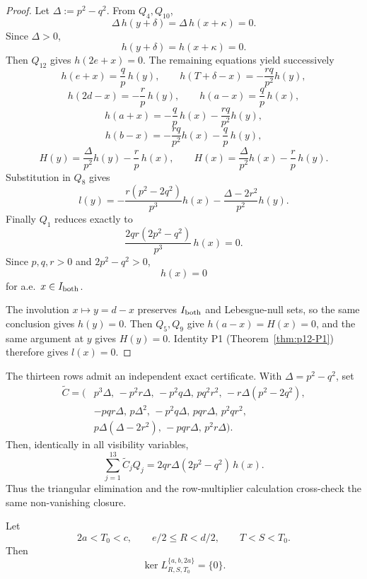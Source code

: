 \begin{proof}
Let \(\Delta:=p^2-q^2\).  From \(Q_4,Q_{10}\),
\[
\Delta\,h(y+\delta)=\Delta\,h(x+\kappa)=0.
\]
Since \(\Delta>0\),
\[
h(y+\delta)=h(x+\kappa)=0.
\]
Then \(Q_{12}\) gives \(h(2e+x)=0\).  The remaining equations yield
successively
\[
h(e+x)=\frac qp\,h(y),
\qquad
h(T+\delta-x)=-\frac{rq}{p^2}h(y),
\]
\[
h(2d-x)=-\frac rp\,h(y),
\qquad
h(a-x)=\frac qp\,h(x),
\]
\[
h(a+x)=-\frac qp\,h(x)-\frac{rq}{p^2}h(y),
\]
\[
h(b-x)=-\frac{rq}{p^2}h(x)-\frac qp\,h(y),
\]
\[
H(y)=\frac{\Delta}{p^2}h(y)-\frac rp\,h(x),
\qquad
H(x)=\frac{\Delta}{p^2}h(x)-\frac rp\,h(y).
\]
Substitution in \(Q_8\) gives
\[
l(y)=
-\frac{r(p^2-2q^2)}{p^3}h(x)
-\frac{\Delta-2r^2}{p^2}h(y).
\]
Finally \(Q_1\) reduces exactly to
\[
\frac{2qr(2p^2-q^2)}{p^3}\,h(x)=0.
\]
Since \(p,q,r>0\) and \(2p^2-q^2>0\),
\[
h(x)=0
\]
for a.e.\ \(x\in I_{\rm both}\).

The involution \(x\mapsto y=d-x\) preserves \(I_{\rm both}\) and
Lebesgue-null sets, so the same conclusion gives \(h(y)=0\).
Then \(Q_5,Q_9\) give \(h(a-x)=H(x)=0\), and the same argument at
\(y\) gives \(H(y)=0\).  Identity P1
(Theorem~\ref{thm:p12-P1}) therefore gives \(l(x)=0\).
\end{proof}

\begin{remark}
\label{rem:p12-b2d-core-both-certificate}
The thirteen rows admit an independent exact certificate.  With
\(\Delta=p^2-q^2\), set
\[
\begin{aligned}
\widetilde C=(&
p^3\Delta,\,
-p^2r\Delta,\,
-p^2q\Delta,\,
pq^2r^2,\,
-r\Delta(p^2-2q^2),\\
&-pqr\Delta,\,
p\Delta^2,\,
-p^2q\Delta,\,
pqr\Delta,\,
p^2qr^2,\\
&p\Delta(\Delta-2r^2),\,
-pqr\Delta,\,
p^2r\Delta).
\end{aligned}
\]
Then, identically in all visibility variables,
\[
\sum_{j=1}^{13}\widetilde C_jQ_j
=
2qr\Delta(2p^2-q^2)\,h(x).
\]
Thus the triangular elimination and the row-multiplier calculation
cross-check the same non-vanishing closure.
\end{remark}

\begin{theorem}
\label{thm:p12-b2d-full}
Let
\[
2a<T_0<c,\qquad e/2\le R<d/2,\qquad T<S<T_0.
\]
Then
\[
\ker L_{R,S,T_0}^{\{a,b,2a\}}=\{0\}.
\]
\end{theorem}

